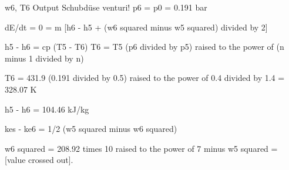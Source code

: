 w6, T6 Output  
Schubdüse venturi!  
p6 = p0 = 0.191 bar  

dE/dt = 0 = m [h6 - h5 + (w6 squared minus w5 squared) divided by 2]  

h5 - h6 = cp (T5 - T6)  
T6 = T5 (p6 divided by p5) raised to the power of (n minus 1 divided by n)  

T6 = 431.9 (0.191 divided by 0.5) raised to the power of 0.4 divided by 1.4 = 328.07 K  

h5 - h6 = 104.46 kJ/kg  

kes - ke6 = 1/2 (w5 squared minus w6 squared)  

w6 squared = 208.92 times 10 raised to the power of 7 minus w5 squared = [value crossed out].